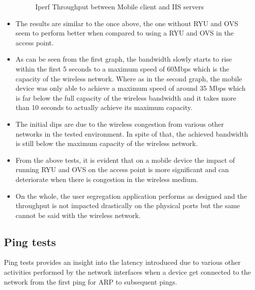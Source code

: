 \begin{itemize}
	\begin{figure}[H]
		\centering
		\hfill
		\caption{Iperf Throughput between Mobile client and IIS servers}
	\end{figure}
	\item The results are similar to the once above, the one without RYU and OVS seem to perform better when compared to using a RYU and OVS in the access point. 
	\item As can be seen from the first graph, the bandwidth slowly starts to rise within the first 5 seconds to a maximum speed of 60Mbps which is the capacity of the wireless network. Where as in the second graph, the mobile device was only able to achieve a maximum speed of around 35 Mbps which is far below the full capacity of the wireless bandwidth and it takes more than 10 seconds to actually achieve its maximum capacity. 
	\item The initial dips are due to the wireless congestion from various other networks in the tested environment. In spite of that, the achieved bandwidth is still below the maximum capacity of the wireless network.
	\item From the above tests, it is evident that on a mobile device the impact of running RYU and OVS on the access point is more significant and can deteriorate when there is congestion in the wireless medium.
	\item On the whole, the user segregation application performs as designed and the throughput is not impacted drastically on the physical ports but the same cannot be said with the wireless network.
	
\end{itemize}
\subsection{Ping tests}
Ping tests provides an insight into the latency introduced due to various other activities performed by the network interfaces when a device get connected to the network from the first ping for ARP to subsequent pings.